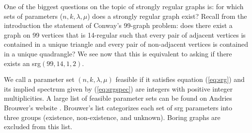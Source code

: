 \documentclass[12pt]{report}
\theoremstyle{definition}
\begin{document}
 One of the biggest questions on the topic of strongly regular graphs is: for which sets of parameters ($n,k,\lambda,\mu$) does a strongly regular graph exist? Recall from the introduction the statement of Conway's 99-graph problem: does there exist a graph on 99 vertices that is 14-regular such that every pair of adjacent vertices is contained in a unique triangle and every pair of non-adjacent vertices is contained in a unique quadrangle? We see now that this is equivalent to asking if there exists an srg$(99,14,1,2)$.\par
 We call a parameter set $(n,k,\lambda,\mu)$ feasible if it satisfies equation (\ref{eq:srg}) and its implied spectrum given by (\ref{eq:srgspec}) are integers with positive integer multiplicities. A large list of feasible parameter sets can be found on Andries Brouwer's website \cite{brouwer}. Brouwer's list categorizes each set of srg parameters into three groups (existence, non-existence, and unknown). Boring graphs are excluded from this list.\par
\end{document}
